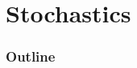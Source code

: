 


\newcommand{\RR}{\mathbf R}
\newcommand{\CC}{\mathbf C}
\newcommand{\ZZ}{\mathbf Z}
\newcommand{\ZZn}[1]{\ZZ/{#1}\ZZ}
\newcommand{\QQ}{\mathbf Q}
\newcommand{\rr}{\mathbb R}
\newcommand{\cc}{\mathbb C}
\newcommand{\zz}{\mathbb Z}
\newcommand{\zzn}[1]{\zz/{#1}\zz}
\newcommand{\qq}{\mathbb Q}
\newcommand{\calM}{\mathcal M}
\newcommand{\latex}{\LaTeX}
\newcommand{\tex}{\TeX}
\newcommand{\sm}{\setminus} 

\newcommand{\tfix}{\rule{0pt}{2.6ex}}
\newcommand{\bfix}{\rule[-1.2ex]{0pt}{0pt}}



\newcommand{\intf}[1]{\int_a^b{#1}\,dx}
\newcommand{\intfb}[3]{\int_{#1}^{#2}{#3}\,dx}
\newcommand{\marginalfootnote}[1]{%
        \footnote{#1}
        \marginpar[\hfill{\sf\thefootnote}]{{\sf\thefootnote}}}
\newcommand{\edit}[1]{\marginalfootnote{#1}}


\newcommand{\Tr}{\operatorname {Tr}}
\newcommand{\GL}{\operatorname {GL}}
\newcommand{\SL}{\operatorname {SL}}
\newcommand{\Prob}{\operatorname {Prob}}
\newcommand{\re}{\operatorname {Re}}
\newcommand{\im}{\operatorname {Im}}






\section{Stochastics}
\begin{frame}
  \frametitle{Outline}
  \tableofcontents[ currentsection ]
\end{frame}

